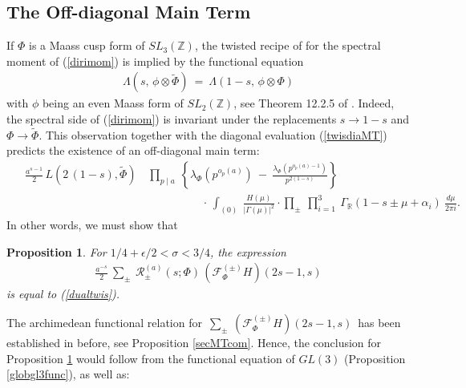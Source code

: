 \documentclass[11pt,reqno]{amsart}
\newtheorem{prop}[thm]{Proposition}
\theoremstyle{definition}
\theoremstyle{definition}
\theoremstyle{remark}
\newcommand{\R}{\ensuremath{\mathbb{R}}}
\newcommand{\Z}{\ensuremath{\mathbb{Z}}}
\numberwithin{equation}{section}
\begin{document}
 	 \subsection{The Off-diagonal Main Term}\label{ODMt}
If $\Phi$ is a Maass cusp form of $SL_{3}(\Z)$, the  twisted recipe of \cite{CFKRS05} for the spectral  moment of  (\ref{dirimom})  is implied by the functional equation 
 	 \begin{align}
 	 	\Lambda(s, \, \phi\otimes \widetilde{\Phi}) \ = \   	\Lambda(1-s,\, \phi\otimes \Phi)
 	 \end{align}
 with  $\phi$ being an even Maass form of $SL_{2}(\Z)$, see Theorem 12.2.5 of \cite{Go15}.  Indeed,   the spectral side of (\ref{dirimom})  is  invariant under the replacements  $s \to 1-s$ and $\Phi \rightarrow \widetilde{\Phi}$. This observation together with the diagonal evaluation  (\ref{twisdiaMT}) predicts the existence of an off-diagonal  main term:
 	 \begin{align}\label{dualtwis}
 	 \hspace{15pt} 	\frac{a^{s-1}}{2}  \,    L\left( 2\, (1-s), \widetilde{\Phi}\right) & \,   \prod_{p\mid a} \ \left\{   \lambda_{\Phi}\left(p^{o_{p}(a)}\right) \ - \   \frac{\lambda_{\Phi}\left(p^{o_{p}(a)-1}\right) }{p^{2(1-s)}} \right\} \nonumber\\[0.1in]
 	 	& \hspace{60pt} \cdot \,  \int_{(0)} \ \frac{H(\mu)}{\left|\Gamma(\mu)\right|^2} \cdot \prod_{\pm} \ \prod_{i=1}^{3} \ \Gamma_{\R}\left(1-s \pm \mu + \alpha_{i}\right) \ \frac{d\mu}{2\pi i}. 
 	 \end{align}
 	 In other words, we must show that
  \begin{prop}\label{twismatchporp}
For $1/4 +\epsilon/2< \sigma < 3/4$, the expression
  \begin{align}\label{matchagainstwsi}
  	\frac{a^{-s}}{2} \   \sum_{\pm} \     \mathcal{R}_{\pm}^{(a)}(s; \Phi) \, (\mathcal{F}_{\Phi}^{(\pm)} H)\left(2s-1,  s\right)
  \end{align}
  is equal to   (\ref{dualtwis}). 
  \end{prop}
  

  
   The archimedean functional relation for\,  $  \sum_{\pm} \  (\mathcal{F}_{\Phi}^{(\pm)} H)\left(2s-1,  s\right)$\,  has been established in \cite{Kw23} before, see  Proposition \ref{secMTcom}.  Hence,  the conclusion for  Proposition \ref{twismatchporp}  would follow from the functional equation  of $GL(3)$  (Proposition \ref{globgl3func}), as well as:  
  
\end{document}
